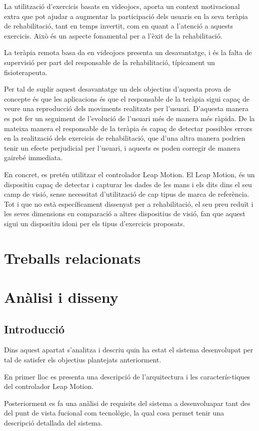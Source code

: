 \documentclass[12pt,a4paper,catalan]{article}
\begin{document}
	La utilització d'exercicis basats en videojocs, aporta un context motivacional extra que pot ajudar a augmentar la participació dels usuaris en la seva teràpia de rehabilitació, tant en temps invertit, com en quant a l'atenció a aquests exercicis. Això és un aspecte fonamental per a l'èxit de la rehabilitació.
	
	La teràpia remota basa da en videojocs presenta un desavantatge, i és la falta de supervisió per part del responsable de la rehabilitació, típicament un fisioterapeuta.
	
	Per tal de suplir aquest desavantatge un dels objectius d'aquesta prova de concepte és que les aplicacions és que el responsable de la teràpia sigui capaç de veure una reproducció dels moviments realitzats per l'usuari. D'aquesta manera es pot fer un seguiment de l'evolució de l'usuari més de manera més ràpida. De la mateixa manera el responsable de la teràpia és capaç de detectar possibles errors en la realització dels exercicis de rehabilitació, que d'una altra manera podrien tenir un efecte perjudicial per l'usuari, i aquests es poden corregir de manera gairebé immediata.
	
	En concret, es pretén utilitzar el controlador Leap Motion. El Leap Motion, és un dispositiu capaç de detectar i capturar les dades de les mans i els dits dins el seu camp de visió, sense necessitat d'utilització de cap tipus de marca de referència. Tot i que no està específicament dissenyat per a rehabilitació, el seu preu reduït i les seves dimensions en comparació a altres dispositius de visió, fan que aquest sigui un dispositiu idoni per els tipus d'exercicis proposats.
	\section{Treballs relacionats}
	\section{Anàlisi i disseny}
	\subsection{Introducció}
	\indent Dins aquest apartat s'analitza i descriu quin ha estat el sistema desenvolupat per tal de satisfer els objectius plantejats anteriorment.
	
	En primer lloc es presenta una descripció de l'arquitectura i les caracterís-tiques del controlador Leap Motion.
	
	Posteriorment es fa una anàlisi de requisits del sistema a desenvoluapar tant des del punt de vista fucional com tecnològic, la qual cosa permet tenir una descripció detallada del sistema.
	
\end{document}
